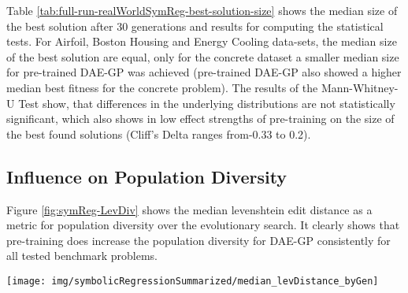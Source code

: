 \documentclass[
  11pt,
]{article}
\let\origfigure\figure
\let\endorigfigure\endfigure
\renewenvironment{figure}[1][2] {
    \expandafter\origfigure\expandafter[H]
} {
    \endorigfigure
}
\begin{document}
Table \ref{tab:full-run-realWorldSymReg-best-solution-size} shows the median size of the best solution after 30 generations and results for computing the statistical tests.
For Airfoil, Boston Housing and Energy Cooling data-sets, the median size of the best solution are equal, only for the concrete dataset a smaller median size for pre-trained DAE-GP was achieved (pre-trained DAE-GP also showed a higher median best fitness for the concrete problem).
The results of the Mann-Whitney-U Test show, that differences in the underlying distributions are not statistically significant, which also shows in low effect strengths of pre-training on the size of the best found solutions (Cliff's Delta ranges from-0.33 to 0.2).

\hypertarget{influence-on-population-diversity}{%
\subsection{Influence on Population Diversity}\label{influence-on-population-diversity}}

Figure \ref{fig:symReg-LevDiv} shows the median levenshtein edit distance as a metric for population diversity over the evolutionary search.
It clearly shows that pre-training does increase the population diversity for DAE-GP consistently for all tested benchmark problems.

\begin{figure}[c]

{\centering \texttt{[image: img/symbolicRegressionSummarized/median\_levDistance\_byGen]} 

}

\caption{Population Diversity over 30 Generations - Real World Symbolic Regression}\label{fig:symReg-LevDiv}
\end{figure}
\end{document}
